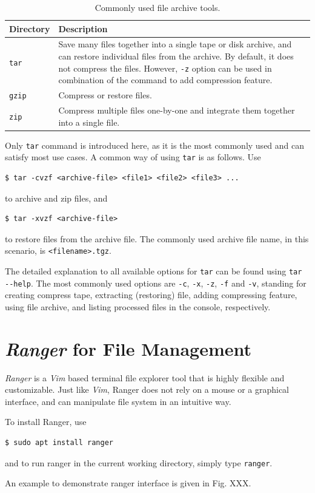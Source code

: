 \begin{table}
	\centering \caption{Commonly used file archive tools.}\label{ch:fm:tab:filearchivetools}
	\begin{tabularx}{\textwidth}{lX}
		\hline
		Directory & Description \\ \hline
		\verb|tar| & Save many files together into a single tape or disk archive, and can
		restore individual files from the archive. By default, it does not compress the files. However, \verb|-z| option can be used in combination of the command to add compression feature. \\ \hdashline
		\verb|gzip| & Compress or restore files. \\ \hdashline
		\verb|zip| & Compress multiple files one-by-one and integrate them together into a single file. \\
		\hline
	\end{tabularx}
\end{table}

Only \verb|tar| command is introduced here, as it is the most commonly used and can satisfy most use cases. A common way of using \verb|tar| is as follows. Use
\begin{lstlisting}
$ tar -cvzf <archive-file> <file1> <file2> <file3> ...
\end{lstlisting}
to archive and zip files, and
\begin{lstlisting}
$ tar -xvzf <archive-file>
\end{lstlisting}
to restore files from the archive file. The commonly used archive file name, in this scenario, is \verb|<filename>.tgz|.

The detailed explanation to all available options for \verb|tar| can be found using \verb|tar --help|. The most commonly used options are \verb|-c|, \verb|-x|, \verb|-z|, \verb|-f| and \verb|-v|, standing for creating compress tape, extracting (restoring) file, adding compressing feature, using file archive, and listing processed files in the console, respectively.

\section{\textit{Ranger} for File Management}

\textit{Ranger} is a \textit{Vim} based terminal file explorer tool that is highly flexible and customizable. Just like \textit{Vim}, Ranger does not rely on a mouse or a graphical interface, and can manipulate file system in an intuitive way.

To install Ranger, use
\begin{lstlisting}
$ sudo apt install ranger
\end{lstlisting}
and to run ranger in the current working directory, simply type \verb|ranger|.

An example to demonstrate ranger interface is given in Fig. XXX.
















